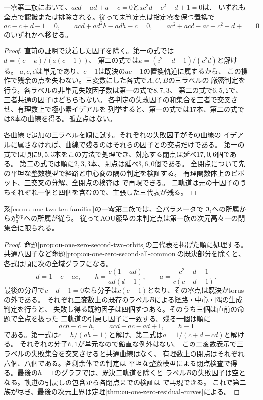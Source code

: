\begin{proposition}[一零第二族の二つの追加軌道]
\label{prop:ou-one-zero-second-two-orbits}
一零第二族において、$acd-ad+a-c=0$と$ac^2d-c^2-d+1=0$は、
いずれも全点で認識または排除される。従って未判定点は指定零を保つ置換で
\[
 ac-c+d-1=0,\qquad acd+ad^2h-adh-c=0,\qquad
 ac^2+acd-ac-c^2-d+1=0
\]
のいずれかへ移せる。
\end{proposition}
\begin{proof}
直前の証明で決着した因子を除く。第一の式では$d=(c-a)/(a(c-1))$、
第二の式では$a=(c^2+d-1)/(c^2d)$と解ける。
$a,c,d$は単元であり、$c-1$は既決の$ac-1$の置換軌道に属するから、
この操作で残余の点を失わない。三変数にした各式で$A,C,B$の三ラベルの
厳密判定を行う。各ラベルの非単元失敗因子数は第一の式で$8,7,3$、
第二の式で$6,5,2$で、三者共通の因子はどちらもない。
各判定の失敗因子の和集合を三者で交叉させ、有理数上で極小素イデアルを
列挙すると、第一の式では17本、第二の式では8本の曲線を得る。孤立点はない。

各曲線で追加の三ラベルを順に試す。それぞれの失敗因子がその曲線の
イデアルに属さなければ、曲線で残るのはそれらの因子との交点だけである。
第一の式では順に$9,5,3$本をこの方法で処理でき、対応する閉点は延べ$17,0,6$個である。
第二の式では順に$2,3,3$本、閉点は延べ$8,6,0$個である。
全閉点について先の平坦な整数模型で経路と中心商の隅の判定を検証する。
有理関数体上のピボット、三交叉の分解、全閉点の検査は
で再現できる。
二軌道は元の十因子のうちそれぞれ一個と四個を含むので、主張した三代表が残る。
\end{proof}

\begin{theorem}[一零第二族の全特殊化]
\label{thm:ou-one-zero-second-complete}
系\ref{cor:ou-one-two-ten-families}の一零第二族では、全パラメータで
$\mathfrak I_3$への所属から$\mathfrak H^{\mathrm{hyp}}_3$への所属が従う。
従ってAOU箙型の未判定点は第一族の次元高々一の閉集合に限られる。
\end{theorem}
\begin{proof}
命題\ref{prop:ou-one-zero-second-two-orbits}の三代表を掲げた順に処理する。
共通八因子など命題\ref{prop:ou-one-zero-second-all-common}の既決部分を除くと、
各式は順に次の全域グラフになる。
\[
 d=1+c-ac,\qquad h=\frac{c(1-ad)}{ad(d-1)},\qquad
 a=\frac{c^2+d-1}{c(c+d-1)}.
\]
最後の分母で$c+d-1=0$なら分子は$c(c-1)$となり、その零点は既決かtorusの外である。
それぞれ三変数上の既存のラベル$B$による経路・中心・隅の生成判定を行うと、
失敗し得る既約因子は四個ずつある。そのうち三個は直前の命題で全点を扱った
二軌道の引戻し因子に一致する。残る一個は順に
\[
 ach-c-h,\qquad acd-ac-ad+1,\qquad h-1
\]
である。第一式は$c=h/(ah-1)$と解け、第二式は$a=1/(c+d-cd)$と解ける。
それぞれの分子$h,1$が単元なので鉛直な例外はない。
この二変数表示で三ラベルの失敗集合を交叉させると共通曲線はなく、
有理数上の閉点はそれぞれ六個、八個である。各剰余体での判定は
平坦な整数模型による閉点検査で得る。最後の$h=1$のグラフでは、既決二軌道を除くと
ラベル$B$の失敗因子は空となる。軌道の引戻しの包含から各閉点までの検証は
で再現できる。
これで第二族が尽き、最後の次元上界は定理\ref{thm:ou-one-zero-residual-curves}による。
\end{proof}

